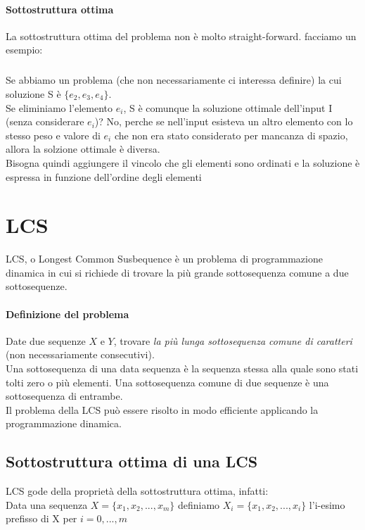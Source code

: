 \paragraph{Sottostruttura ottima}
La sottostruttura ottima del problema non è molto straight-forward. facciamo un esempio:
\subparagraph*{}Se abbiamo un problema (che non necessariamente ci interessa definire) la cui soluzione S è $\{e_2,e_3,e_4\}$.\\
Se eliminiamo l'elemento $e_i$, S è comunque la soluzione ottimale dell'input I (senza considerare $e_i$)? No, perche se nell'input esisteva un altro elemento con lo stesso peso e valore di $e_i$ che non era stato considerato per mancanza di spazio, allora la solzione ottimale è diversa.
\\Bisogna quindi aggiungere il vincolo che gli elementi sono ordinati e la soluzione è espressa in funzione dell'ordine degli elementi

\section{LCS}
LCS, o Longest Common Susbequence è un problema di programmazione dinamica in cui si richiede di trovare la più grande sottosequenza comune a due sottosequenze.

\paragraph{Definizione del problema}
Date due sequenze $X$ e $Y$, trovare \emph{la più lunga sottosequenza comune di caratteri} (non necessariamente consecutivi).\\
Una sottosequenza di una data sequenza è la sequenza stessa alla quale sono stati tolti zero o più elementi.
Una sottosequenza comune di due sequenze è una sottosequenza di entrambe.
\\Il problema della LCS può essere risolto in modo efficiente applicando la programmazione dinamica.

\subsection*{Sottostruttura ottima di una LCS}
LCS gode della proprietà della sottostruttura ottima, infatti:
\\Data una sequenza $X=\{x_1,x_2,...,x_m\}$ definiamo $X_i=\{x_1,x_2,...,x_i\}$ l'i-esimo prefisso di X per $i = 0,...,m$

